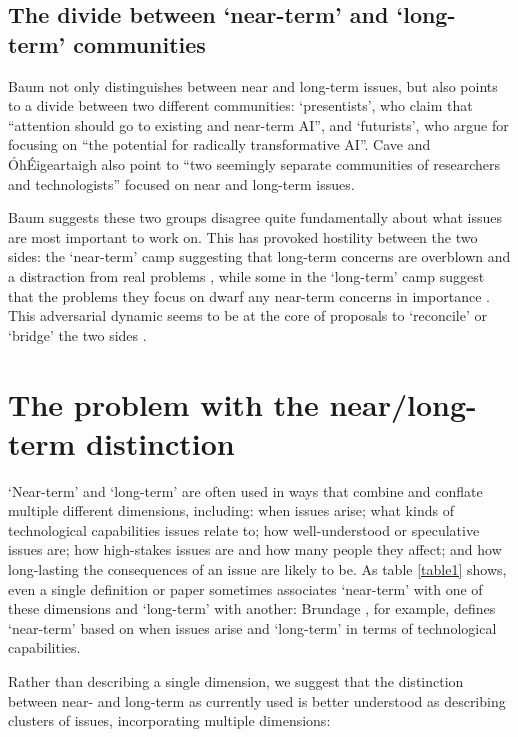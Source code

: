 \documentclass[sigconf]{acmart}
\begin{document}
\subsection{The divide between `near-term' and `long-term' communities}

Baum \cite{baum2018} not only distinguishes between near and long-term issues, but also points to a divide between two different communities: `presentists', who claim that ``attention should go to existing and near-term AI'', and `futurists', who argue for focusing on ``the potential for radically transformative AI''. Cave and \'{O}h\'{E}igeartaigh \cite{cave_bridging_2019} also point to ``two seemingly separate communities of researchers and technologists'' focused on near and long-term issues.

Baum suggests these two groups disagree quite fundamentally about what issues are most important to work on. This has provoked hostility between the two sides: the `near-term' camp suggesting that long-term concerns are overblown and a distraction from real problems \cite{etzioni_no_2016,crawfordcalo2016}, while some in the `long-term' camp suggest that the problems they focus on dwarf any near-term concerns in importance \cite{tegmark2017,bostrom_superintelligence_2014}. This adversarial dynamic seems to be at the core of proposals to `reconcile' or `bridge' the two sides \cite{baum2018,cave_bridging_2019}.

\section{The problem with the near/long-term distinction}

`Near-term' and `long-term' are often used in ways that combine and conflate multiple different dimensions, including: when issues arise; what kinds of technological capabilities issues relate to; how well-understood or speculative issues are; how high-stakes issues are and how many people they affect; and how long-lasting the consequences of an issue are likely to be. As table \ref{table1} shows, even a single definition or paper sometimes associates `near-term' with one of these dimensions and `long-term' with another: Brundage \cite{brundage_guide_2017}, for example, defines `near-term' based on when issues arise and `long-term' in terms of technological capabilities. 

Rather than describing a single dimension, we suggest that the distinction between near- and long-term as currently used is better understood as describing clusters of issues, incorporating multiple dimensions:
\end{document}
